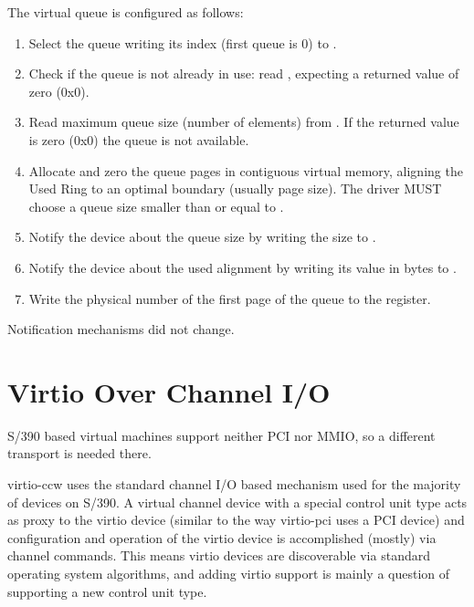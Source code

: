 The virtual queue is configured as follows:
\begin{enumerate}
\item Select the queue writing its index (first queue is 0) to
   .

\item Check if the queue is not already in use: read ,
   expecting a returned value of zero (0x0).

\item Read maximum queue size (number of elements) from
   . If the returned value is zero (0x0) the
   queue is not available.

\item Allocate and zero the queue pages in contiguous virtual
   memory, aligning the Used Ring to an optimal boundary (usually
   page size). The driver MUST choose a queue size smaller than or
   equal to .

\item Notify the device about the queue size by writing the size to
   .

\item Notify the device about the used alignment by writing its value
   in bytes to .

\item Write the physical number of the first page of the queue to
   the  register.
\end{enumerate}

Notification mechanisms did not change.

\section{Virtio Over Channel I/O}\label{sec:Virtio Transport Options / Virtio Over Channel I/O}

S/390 based virtual machines support neither PCI nor MMIO, so a
different transport is needed there.

virtio-ccw uses the standard channel I/O based mechanism used for
the majority of devices on S/390. A virtual channel device with a
special control unit type acts as proxy to the virtio device
(similar to the way virtio-pci uses a PCI device) and
configuration and operation of the virtio device is accomplished
(mostly) via channel commands. This means virtio devices are
discoverable via standard operating system algorithms, and adding
virtio support is mainly a question of supporting a new control
unit type.

